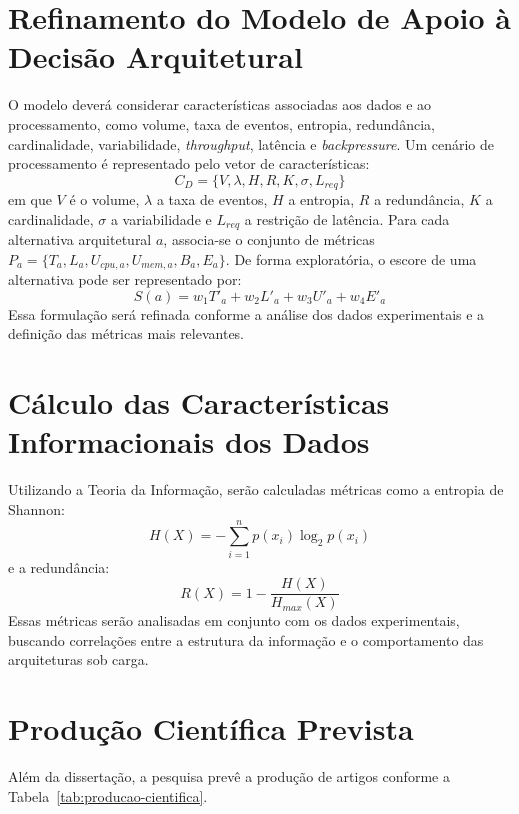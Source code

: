 \section{Refinamento do Modelo de Apoio à Decisão Arquitetural}
\label{sec:refinamento-modelo-proximos}
O modelo deverá considerar características associadas aos dados e ao processamento, como volume, taxa de eventos, entropia, redundância, cardinalidade, variabilidade, \textit{throughput}, latência e \textit{backpressure}. Um cenário de processamento é representado pelo vetor de características:
\begin{equation}
C_D = \{V, \lambda, H, R, K, \sigma, L_{req}\}
\label{eq:vetor-cenario-proximos}
\end{equation}
em que $V$ é o volume, $\lambda$ a taxa de eventos, $H$ a entropia, $R$ a redundância, $K$ a cardinalidade, $\sigma$ a variabilidade e $L_{req}$ a restrição de latência. Para cada alternativa arquitetural $a$, associa-se o conjunto de métricas $P_a = \{T_a, L_a, U_{cpu,a}, U_{mem,a}, B_a, E_a\}$. De forma exploratória, o escore de uma alternativa pode ser representado por:
\begin{equation}
S(a) = w_1T'_a + w_2L'_a + w_3U'_a + w_4E'_a
\label{eq:score-proximos}
\end{equation}
Essa formulação será refinada conforme a análise dos dados experimentais e a definição das métricas mais relevantes.

\section{Cálculo das Características Informacionais dos Dados}
\label{sec:calculo-caracteristicas-proximos}
Utilizando a Teoria da Informação, serão calculadas métricas como a entropia de Shannon:
\begin{equation}
H(X) = - \sum_{i=1}^{n} p(x_i) \log_2 p(x_i)
\end{equation}
e a redundância:
\begin{equation}
R(X) = 1 - \frac{H(X)}{H_{max}(X)}
\end{equation}
Essas métricas serão analisadas em conjunto com os dados experimentais, buscando correlações entre a estrutura da informação e o comportamento das arquiteturas sob carga.

\section{Produção Científica Prevista}
\label{sec:producao-cientifica-proximos}
Além da dissertação, a pesquisa prevê a produção de artigos conforme a Tabela~\ref{tab:producao-cientifica}.

